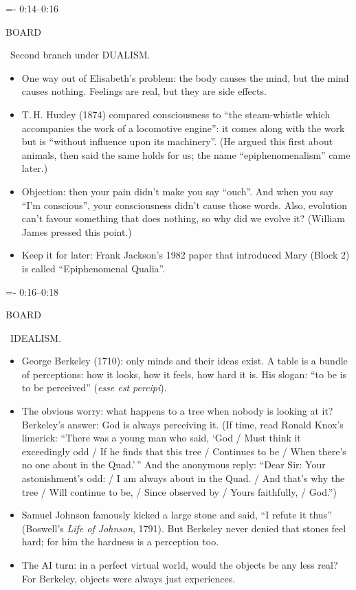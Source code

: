 \documentclass[11pt,letterpaper]{article}
\makeatletter
\newcommand{\keep}[1]{\par\penalty\z@\begingroup\dimen@=#1\relax\dimen@ii=\pagegoal\advance\dimen@ii-\pagetotal
  \ifdim\dimen@>\dimen@ii\ifdim\dimen@ii>\z@\vfil\break\fi\fi\endgroup}
\newcommand{\beat}[2]{\keep{3\baselineskip}\vspace{5pt}\noindent{\sffamily\bfseries #1}\hfill{\sffamily\small\color{muted}#2}\par\nopagebreak\vspace{1pt}}
\newcommand{\tagbox}[1]{\colorbox{tagbg}{\sffamily\scriptsize\bfseries\color{accent}\strut #1}}
\newcommand{\board}{\tagbox{BOARD}\ }
\makeatother
\begin{document}
\beat{Epiphenomenalism}{0:14--0:16}
\board Second branch under DUALISM.
\begin{itemize}
\item One way out of Elisabeth's problem: the body causes the mind, but the mind causes nothing. Feelings are real, but they are side effects.
\item T.\,H. Huxley (1874) compared consciousness to ``the steam-whistle which accompanies the work of a locomotive engine'': it comes along with the work but is ``without influence upon its machinery''. (He argued this first about animals, then said the same holds for us; the name ``epiphenomenalism'' came later.)
\item Objection: then your pain didn't make you say ``ouch''. And when you say ``I'm conscious'', your consciousness didn't cause those words. Also, evolution can't favour something that does nothing, so why did we evolve it? (William James pressed this point.)
\item Keep it for later: Frank Jackson's 1982 paper that introduced Mary (Block 2) is called ``Epiphenomenal Qualia''.
\end{itemize}

\beat{Idealism: only mind}{0:16--0:18}
\board IDEALISM.
\begin{itemize}
\item George Berkeley (1710): only minds and their ideas exist. A table is a bundle of perceptions: how it looks, how it feels, how hard it is. His slogan: ``to be is to be perceived'' (\emph{esse est percipi}).
\item The obvious worry: what happens to a tree when nobody is looking at it? Berkeley's answer: God is always perceiving it. (If time, read Ronald Knox's limerick: ``There was a young man who said, `God / Must think it exceedingly odd / If he finds that this tree / Continues to be / When there's no one about in the Quad.'\,'' And the anonymous reply: ``Dear Sir: Your astonishment's odd: / I am always about in the Quad. / And that's why the tree / Will continue to be, / Since observed by / Yours faithfully, / God.'')
\item Samuel Johnson famously kicked a large stone and said, ``I refute it thus'' (Boswell's \emph{Life of Johnson}, 1791). But Berkeley never denied that stones feel hard; for him the hardness is a perception too.
\item The AI turn: in a perfect virtual world, would the objects be any less real? For Berkeley, objects were always just experiences.
\end{itemize}
\end{document}
